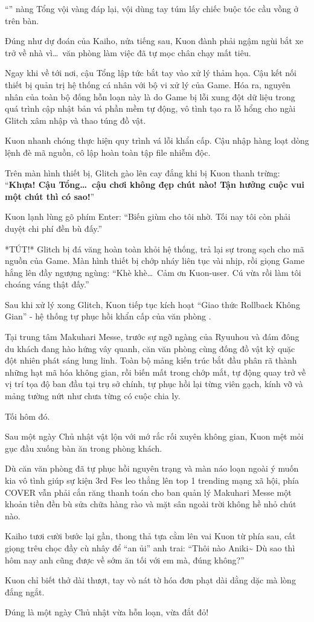 \documentclass[../main.tex]{subfiles}
\begin{document}
``'' nàng Tổng vội vàng đáp lại, vội dùng tay túm lấy chiếc buộc tóc cầu vồng ở trên bàn.

\ct

Đúng như dự đoán của Kaiho, nửa tiếng sau, Kuon đành phải ngậm ngùi bắt xe trở về nhà vì\dots\ văn phòng làm việc đã tự mọc chân chạy mất tiêu.

Ngay khi về tới nơi, cậu Tổng lập tức bắt tay vào xử lý thảm họa. Cậu kết nối thiết bị quản trị hệ thống cá nhân với bộ vi xử lý của Game. Hóa ra, nguyên nhân của toàn bộ đống hỗn loạn này là do Game bị lỗi xung đột dữ liệu trong quá trình cập nhật bản vá phần mềm tự động, vô tình tạo ra lỗ hổng cho ngài Glitch xâm nhập và thao túng đồ vật.

Kuon nhanh chóng thực hiện quy trình vá lỗi khẩn cấp. Cậu nhập hàng loạt dòng lệnh đè mã nguồn, cô lập hoàn toàn tập file nhiễm độc.

Trên màn hình thiết bị, Glitch gào lên cay đắng khi bị Kuon thanh trừng: ``\textbf{Khựa! Cậu Tổng\dots\ cậu chơi không đẹp chút nào! Tận hưởng cuộc vui một chút thì có sao!}''

Kuon lạnh lùng gõ phím Enter: ``Biến giùm cho tôi nhờ. Tối nay tôi còn phải duyệt chi phí đền bù đấy.''

*TÚT!* Glitch bị đá văng hoàn toàn khỏi hệ thống, trả lại sự trong sạch cho mã nguồn của Game. Màn hình thiết bị chớp nháy liên tục vài nhịp, rồi giọng Game hắng lên đầy ngượng ngùng: ``Khè khè\dots\ Cảm ơn Kuon-user. Cú vừa rồi làm tôi choáng váng thật đấy.''

Sau khi xử lý xong Glitch, Kuon tiếp tục kích hoạt ``Giao thức Rollback Không Gian'' - hệ thống tự phục hồi khẩn cấp của văn phòng \hll.

Tại trung tâm Makuhari Messe, trước sự ngỡ ngàng của Ryuuhou và đám đông du khách đang hào hứng vây quanh, căn văn phòng cùng đống đồ vật kỳ quặc đột nhiên phát sáng lung linh. Toàn bộ mảng kiến trúc bắt đầu phân rã thành những hạt mã hóa không gian, rồi biến mất trong chớp mắt, tự động quay trở về vị trí tọa độ ban đầu tại trụ sở chính, tự phục hồi lại từng viên gạch, kính vỡ và mảng tường nứt như chưa từng có cuộc chia ly.

\ct

Tối hôm đó.

Sau một ngày Chủ nhật vật lộn với mớ rắc rối xuyên không gian, Kuon mệt mỏi gục đầu xuống bàn ăn trong phòng khách.

Dù căn văn phòng đã tự phục hồi nguyên trạng và màn náo loạn ngoài ý muốn kia vô tình giúp sự kiện 3rd Fes leo thẳng lên top 1 trending mạng xã hội, phía COVER vẫn phải cắn răng thanh toán cho ban quản lý Makuhari Messe một khoản tiền đền bù sửa chữa hàng rào và mặt sân ngoài trời không hề nhỏ chút nào.

Kaiho tươi cười bước lại gần, thong thả tựa cằm lên vai Kuon từ phía sau, cất giọng trêu chọc đầy cù nhây để ``an ủi'' anh trai: ``Thôi nào Aniki\~{} Dù sao thì hôm nay anh cũng được về sớm ăn tối với em mà, đúng không?''

Kuon chỉ biết thở dài thượt, tay vò nát tờ hóa đơn phạt dài dằng dặc mà lòng đắng ngắt.

Đúng là một ngày Chủ nhật vừa hỗn loạn, vừa đắt đỏ!
\end{document}
